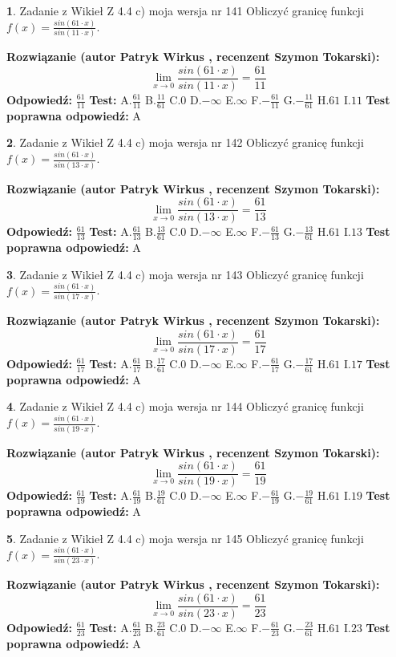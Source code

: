 \documentclass[12pt, a4paper]{article}
\theoremstyle{definition} %
\newtheorem{zad}{}
\newcommand{\zadStart}[1]{\begin{zad}#1\newline}
\newcommand{\zadStop}{\end{zad}}
\newcommand{\rozwStart}[2]{\noindent \textbf{Rozwiązanie (autor #1 , recenzent #2): }\newline}
\newcommand{\rozwStop}{\newline}
\newcommand{\odpStart}{\noindent \textbf{Odpowiedź:}\newline}
\newcommand{\odpStop}{\newline}
\newcommand{\testStart}{\noindent \textbf{Test:}\newline}
\newcommand{\testStop}{\newline}
\newcommand{\kluczStart}{\noindent \textbf{Test poprawna odpowiedź:}\newline}
\newcommand{\kluczStop}{\newline}
\begin{document}
\zadStart{Zadanie z Wikieł Z 4.4 c) moja wersja nr 141}
Obliczyć granicę funkcji $f(x)=\frac{sin(61\cdot x)}{sin(11\cdot x)}$.
\zadStop
\rozwStart{Patryk Wirkus}{Szymon Tokarski}
$$\lim\limits_{x\to 0}\frac{sin(61\cdot x)}{sin(11\cdot x)}=
\frac{61}{11}$$
\rozwStop
\odpStart
$\frac{61}{11}$
\odpStop
\testStart
A.$\frac{61}{11}$
B.$\frac{11}{61}$
C.$0$
D.$-\infty$
E.$\infty$
F.$-\frac{61}{11}$
G.$-\frac{11}{61}$
H.$61$
I.$11$
\testStop
\kluczStart
A
\kluczStop



\zadStart{Zadanie z Wikieł Z 4.4 c) moja wersja nr 142}
Obliczyć granicę funkcji $f(x)=\frac{sin(61\cdot x)}{sin(13\cdot x)}$.
\zadStop
\rozwStart{Patryk Wirkus}{Szymon Tokarski}
$$\lim\limits_{x\to 0}\frac{sin(61\cdot x)}{sin(13\cdot x)}=
\frac{61}{13}$$
\rozwStop
\odpStart
$\frac{61}{13}$
\odpStop
\testStart
A.$\frac{61}{13}$
B.$\frac{13}{61}$
C.$0$
D.$-\infty$
E.$\infty$
F.$-\frac{61}{13}$
G.$-\frac{13}{61}$
H.$61$
I.$13$
\testStop
\kluczStart
A
\kluczStop



\zadStart{Zadanie z Wikieł Z 4.4 c) moja wersja nr 143}
Obliczyć granicę funkcji $f(x)=\frac{sin(61\cdot x)}{sin(17\cdot x)}$.
\zadStop
\rozwStart{Patryk Wirkus}{Szymon Tokarski}
$$\lim\limits_{x\to 0}\frac{sin(61\cdot x)}{sin(17\cdot x)}=
\frac{61}{17}$$
\rozwStop
\odpStart
$\frac{61}{17}$
\odpStop
\testStart
A.$\frac{61}{17}$
B.$\frac{17}{61}$
C.$0$
D.$-\infty$
E.$\infty$
F.$-\frac{61}{17}$
G.$-\frac{17}{61}$
H.$61$
I.$17$
\testStop
\kluczStart
A
\kluczStop



\zadStart{Zadanie z Wikieł Z 4.4 c) moja wersja nr 144}
Obliczyć granicę funkcji $f(x)=\frac{sin(61\cdot x)}{sin(19\cdot x)}$.
\zadStop
\rozwStart{Patryk Wirkus}{Szymon Tokarski}
$$\lim\limits_{x\to 0}\frac{sin(61\cdot x)}{sin(19\cdot x)}=
\frac{61}{19}$$
\rozwStop
\odpStart
$\frac{61}{19}$
\odpStop
\testStart
A.$\frac{61}{19}$
B.$\frac{19}{61}$
C.$0$
D.$-\infty$
E.$\infty$
F.$-\frac{61}{19}$
G.$-\frac{19}{61}$
H.$61$
I.$19$
\testStop
\kluczStart
A
\kluczStop



\zadStart{Zadanie z Wikieł Z 4.4 c) moja wersja nr 145}
Obliczyć granicę funkcji $f(x)=\frac{sin(61\cdot x)}{sin(23\cdot x)}$.
\zadStop
\rozwStart{Patryk Wirkus}{Szymon Tokarski}
$$\lim\limits_{x\to 0}\frac{sin(61\cdot x)}{sin(23\cdot x)}=
\frac{61}{23}$$
\rozwStop
\odpStart
$\frac{61}{23}$
\odpStop
\testStart
A.$\frac{61}{23}$
B.$\frac{23}{61}$
C.$0$
D.$-\infty$
E.$\infty$
F.$-\frac{61}{23}$
G.$-\frac{23}{61}$
H.$61$
I.$23$
\testStop
\kluczStart
A
\kluczStop
\end{document}
